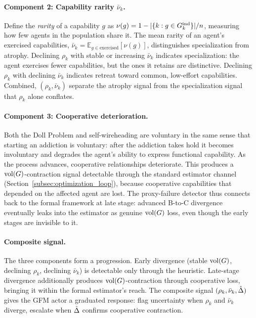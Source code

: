 \paragraph{Component 2: Capability rarity $\bar{\nu}_k$.} Define the
\emph{rarity} of a capability $g$ as $\nu(g) = 1 - |\{k : g \in
G_{k}^{\mathrm{ind}}\}|/n$, measuring how few agents in the population share it. The mean
rarity of an agent's exercised capabilities,
$\bar{\nu}_k = \mathbb{E}_{g \in \mathrm{exercised}}[\nu(g)]$, distinguishes
specialization from atrophy. Declining $\rho_k$ with stable or increasing
$\bar{\nu}_k$ indicates specialization: the agent exercises fewer capabilities,
but the ones it retains are distinctive. Declining $\rho_k$ with declining
$\bar{\nu}_k$ indicates retreat toward common, low-effort capabilities.
Combined, $(\rho_k, \bar{\nu}_k)$ separate the atrophy signal from the
specialization signal that $\rho_k$ alone conflates.

\paragraph{Component 3: Cooperative deterioration.} Both the Doll Problem and
self-wireheading are voluntary in the same sense that starting an addiction is
voluntary: after the addiction takes hold it becomes involuntary and degrades
the agent's ability to express functional capability. As the process advances,
cooperative relationships deteriorate. This produces a $\operatorname{vol}(G)$-contraction
signal detectable through the standard estimator channel
(Section~\ref{subsec:optimization_loop}), because cooperative capabilities
that depended on the affected agent are lost. The proxy-failure detector thus
connects back to the formal framework at late stage: advanced B-to-C
divergence eventually leaks into the estimator as genuine $\operatorname{vol}(G)$ loss, even
though the early stages are invisible to it.

\paragraph{Composite signal.} The three components form a progression. Early
divergence (stable $\operatorname{vol}(G)$, declining $\rho_k$, declining $\bar{\nu}_k$)
is detectable only through the heuristic. Late-stage divergence additionally
produces $\operatorname{vol}(G)$-contraction through cooperative loss, bringing it within
the formal estimator's reach. The composite signal
$(\rho_k, \bar{\nu}_k, \hat{\Delta})$ gives the GFM actor a graduated response:
flag uncertainty when $\rho_k$ and $\bar{\nu}_k$ diverge, escalate when
$\hat{\Delta}$ confirms cooperative contraction.

